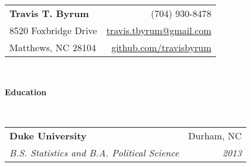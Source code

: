\documentclass[letterpaper,12pt]{article}
\makeatletter
\newcommand{\resheading}[1]{{\large \colorbox{mygrey}{\begin{minipage}{\textwidth}{\textbf{#1 \vphantom{p\^{E}}}}\end{minipage}}}}
\newcommand{\ressubheading}[4]{
\begin{tabular*}{6.9in}{l@{\extracolsep{\fill}}r}
		\textbf{#1} & #2 \\
		\textit{#3} & \textit{#4} \\
\end{tabular*}\vspace{-6pt}}
\makeatother
\begin{document}
\newcommand{\mywebheader}{
\begin{tabular*}{7in}{l@{\extracolsep{\fill}}r}
	\textbf{\Huge Travis T. Byrum}  & (704) 930-8478\\
	8520 Foxbridge Drive & \href{mailto:travis.tbyrum@gmail.com}{travis.tbyrum@gmail.com} \\
	Matthews, NC 28104 & \href{https://github.com/travisbyrum}{github.com/travisbyrum}\\
\end{tabular*}
\\
\vspace{0.1in}}

\mywebheader
\resheading{Education}
\\
			\ressubheading{Duke University}{Durham, NC}{B.S. Statistics and B.A. Political Science}{2013}
\end{document}
